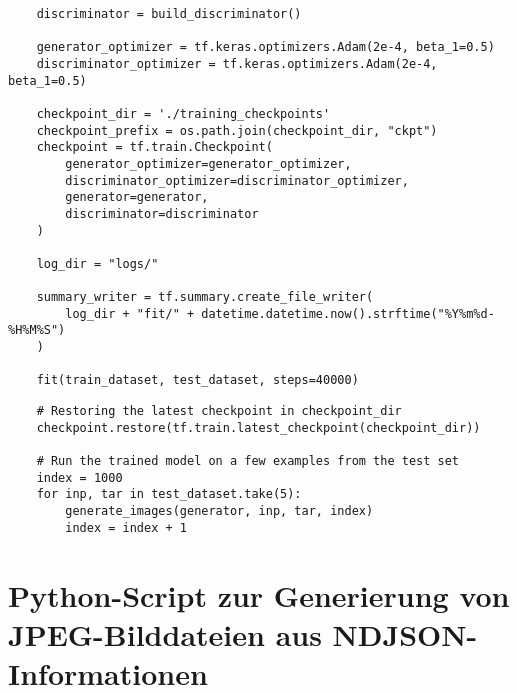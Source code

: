 \begin{lstlisting}
    discriminator = build_discriminator()

    generator_optimizer = tf.keras.optimizers.Adam(2e-4, beta_1=0.5)
    discriminator_optimizer = tf.keras.optimizers.Adam(2e-4, beta_1=0.5)

    checkpoint_dir = './training_checkpoints'
    checkpoint_prefix = os.path.join(checkpoint_dir, "ckpt")
    checkpoint = tf.train.Checkpoint(
        generator_optimizer=generator_optimizer,
        discriminator_optimizer=discriminator_optimizer,
        generator=generator,
        discriminator=discriminator
    )

    log_dir = "logs/"

    summary_writer = tf.summary.create_file_writer(
        log_dir + "fit/" + datetime.datetime.now().strftime("%Y%m%d-%H%M%S")
    )

    fit(train_dataset, test_dataset, steps=40000)

\end{lstlisting}
\pagebreak
\begin{lstlisting}
    # Restoring the latest checkpoint in checkpoint_dir
    checkpoint.restore(tf.train.latest_checkpoint(checkpoint_dir))

    # Run the trained model on a few examples from the test set
    index = 1000
    for inp, tar in test_dataset.take(5):
        generate_images(generator, inp, tar, index)
        index = index + 1

\end{lstlisting}
\vfill

\pagebreak

\section{Python-Script zur Generierung von JPEG-Bilddateien aus NDJSON-Informationen}
\label{ndjsonpy}

